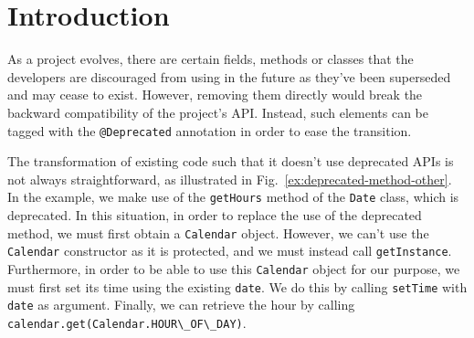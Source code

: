 \documentclass[sigconf,review,anonymous]{acmart}
\begin{document}
\maketitle







\section{Introduction}\label{sec:intro}







As a project evolves, there are certain fields, methods or classes
that the developers are discouraged from using in the future as
they've been superseded and may cease to exist.
However, removing them directly would break the backward compatibility
of the project's API.  Instead, such elements can be tagged with the
\lstinline[breaklines=true]{@Deprecated} annotation in order to ease the transition.


The transformation of existing code such that it doesn't use
deprecated APIs is not always straightforward, as illustrated in
Fig.~\ref{ex:deprecated-method-other}. In the example, we make use of
the \lstinline[breaklines=true]{getHours} method of the \lstinline[breaklines=true]{Date} class, which is
deprecated.  In this situation, in order to replace the use of the
deprecated method, we must first obtain a \lstinline[breaklines=true]{Calendar} object.
However, we can't use the \lstinline[breaklines=true]{Calendar} constructor as it is
protected, and we must instead call \lstinline[breaklines=true]{getInstance}.
Furthermore, in order to be able to use this \lstinline[breaklines=true]{Calendar} object
for our purpose, we must first set its time using the existing
\lstinline[breaklines=true]{date}.  We do this by calling \lstinline[breaklines=true]{setTime} with
\lstinline[breaklines=true]{date} as argument.  Finally, we can retrieve the hour by
calling \lstinline[breaklines=true]{calendar.get(Calendar.HOUR\_OF\_DAY)}.
\end{document}

